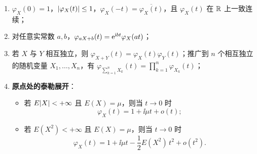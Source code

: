 \begin{proposition}[特征函数的基本性质]
\label{prop:char-func-properties}
\begin{enumerate}
  \item $\varphi_X(0)=1$，$\lvert\varphi_X(t)\rvert\le 1$，$\varphi_X(-t)=\overline{\varphi_X(t)}$，且 $\varphi_X(t)$ 在 $\mathbb{R}$ 上一致连续；
  \item 对任意实常数 $a,b$，$\varphi_{aX+b}(t)=\mathrm{e}^{\mathrm{i} bt}\varphi_X(at)$；
  \item 若 $X$ 与 $Y$ 相互独立，则 $\varphi_{X+Y}(t)=\varphi_X(t)\varphi_Y(t)$；推广到 $n$ 个相互独立的随机变量 $X_1,\ldots,X_n$，有 $\varphi_{\sum_{k=1}^{n}X_k}(t)=\prod_{k=1}^{n}\varphi_{X_k}(t)$；
  \item \textbf{原点处的泰勒展开}：
  \begin{itemize}
    \item 若 $E\lvert X\rvert<+\infty$ 且 $E(X)=\mu$，则当 $t\to 0$ 时
    \begin{equation}
      \varphi_X(t)=1+\ii\mu t+o(t);
      \label{eq:cf-taylor-1}
    \end{equation}
    \item 若 $E(X^2)<+\infty$ 且 $E(X)=\mu$，则当 $t\to 0$ 时
    \begin{equation}
      \varphi_X(t)=1+\ii\mu t-\frac{1}{2}E(X^2)\,t^2+o(t^2).
      \label{eq:cf-taylor-2}
    \end{equation}
  \end{itemize}
\end{enumerate}
\end{proposition}
